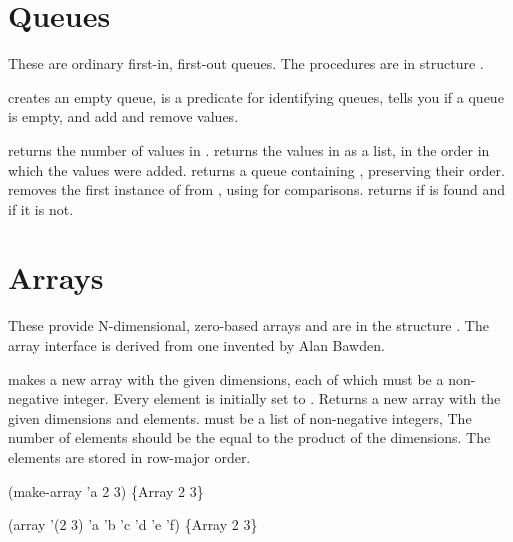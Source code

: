 \section{Queues}

These are ordinary first-in, first-out queues.
The procedures are in structure .

\begin{protos}
\end{protos}
\noindent 
{} creates an empty queue,  is a predicate for
 identifying queues,  tells you if a queue is empty,
  and  add and remove values.

\begin{protos}
\end{protos}
\noindent
{} returns the number of values in .
 returns the values in  as a list, in the
 order in which the values were added.
 returns a queue containing , preserving
 their order.
 removes the first instance of  from
 , using  for comparisons.
 returns  if  is found and
  if it is not.

\section{Arrays}

These provide N-dimensional, zero-based arrays and
 are in the structure .
The array interface is derived from one invented by Alan Bawden.

\begin{protos}
\end{protos}
\noindent
{} makes a new array with the given dimensions, each of which
 must be a non-negative integer.
Every element is initially set to .
 Returns a new array with the given dimensions and elements.
 must be a list of non-negative integers, 
The number of elements should be the equal to the product of the
 dimensions.
The elements are stored in row-major order.
\begin{example}
(make-array 'a 2 3) \evalsto \{Array 2 3\}

(array '(2 3) 'a 'b 'c 'd 'e 'f)
    \evalsto \{Array 2 3\}
\end{example}

